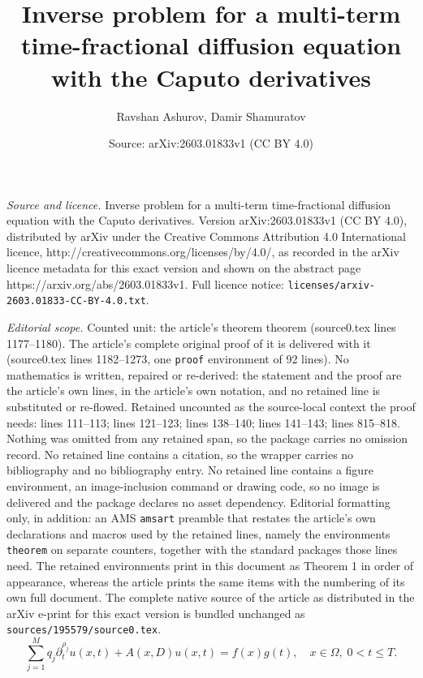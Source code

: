 \documentclass[10pt,a4paper]{amsart}
\title{Inverse problem for a multi-term time-fractional diffusion equation with the Caputo derivatives}
\author{Ravshan Ashurov, Damir Shamuratov}
\date{Source: arXiv:2603.01833v1 (CC BY 4.0)}
\begin{document}
\maketitle

\noindent\emph{Source and licence.} Inverse problem for a multi-term time-fractional diffusion equation with the Caputo derivatives. Version arXiv:2603.01833v1 (CC BY 4.0), distributed by arXiv under the Creative Commons Attribution 4.0 International licence, http://creativecommons.org/licenses/by/4.0/, as recorded in the arXiv licence metadata for this exact version and shown on the abstract page https://arxiv.org/abs/2603.01833v1. Full licence notice: \texttt{licenses/arxiv-2603.01833-CC-BY-4.0.txt}.\par\smallskip

\noindent\textit{Editorial scope.} Counted unit: the article's theorem theorem (source0.tex lines 1177--1180). The article's complete original proof of it is delivered with it (source0.tex lines 1182--1273, one \texttt{proof} environment of 92 lines). No mathematics is written, repaired or re-derived: the statement and the proof are the article's own lines, in the article's own notation, and no retained line is substituted or re-flowed.  Retained uncounted as the source-local context the proof needs: lines 111--113; lines 121--123; lines 138--140; lines 141--143; lines 815--818.  Nothing was omitted from any retained span, so the package carries no omission record.  No retained line contains a citation, so the wrapper carries no bibliography and no bibliography entry.  No retained line contains a figure environment, an image-inclusion command or drawing code, so no image is delivered and the package declares no asset dependency.  Editorial formatting only, in addition: an AMS \texttt{amsart} preamble that restates the article's own declarations and macros used by the retained lines, namely the environments \texttt{theorem} on separate counters, together with the standard packages those lines need.  The retained environments print in this document as Theorem 1 in order of appearance, whereas the article prints the same items with the numbering of its own full document.  The complete native source of the article as distributed in the arXiv e-print for this exact version is bundled unchanged as \texttt{sources/195579/source0.tex}.
\begin{equation}\label{1.1}
 \sum_{j=1}^M q_j  \partial_t^{\rho_j} u(x,t) + A(x,D)u(x,t) = f(x)g(t), \quad x \in \Omega, \; 0 < t \le T.
\end{equation}
\end{document}
